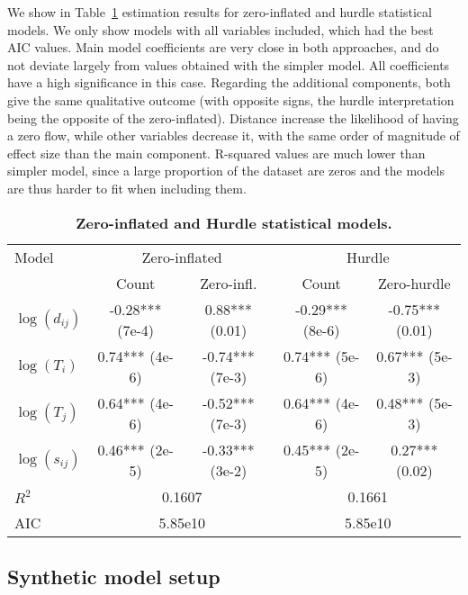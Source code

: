 We show in Table~\ref{tab:zeroinfl} estimation results for zero-inflated and hurdle statistical models. We only show models with all variables included, which had the best AIC values. Main model coefficients are very close in both approaches, and do not deviate largely from values obtained with the simpler model. All coefficients have a high significance in this case. Regarding the additional components, both give the same qualitative outcome (with opposite signs, the hurdle interpretation being the opposite of the zero-inflated). Distance increase the likelihood of having a zero flow, while other variables decrease it, with the same order of magnitude of effect size than the main component. R-squared values are much lower than simpler model, since a large proportion of the dataset are zeros and the models are thus harder to fit when including them.


\begin{table}[!ht]
\begin{adjustwidth}{-1in}{0in}
\caption{{\bf Zero-inflated and Hurdle statistical models.}\label{tab:zeroinfl}}
\medskip
\begin{tabular}{|l|c|c|c|c|}
\hline
Model  & \multicolumn{2}{|c|}{Zero-inflated} & \multicolumn{2}{|c|}{Hurdle} \\ 
 & Count & Zero-infl. & Count & Zero-hurdle \\
\hline
$\log(d_{ij})$ &    -0.28*** (7e-4) &   0.88*** (0.01)      &   -0.29*** (8e-6)   &  -0.75*** (0.01)    \\
$\log(T_i)$ & 0.74*** (4e-6)  & -0.74*** (7e-3)       &   0.74***  (5e-6)     &  0.67*** (5e-3)   \\
$\log(T_j)$ & 0.64*** (4e-6)  & -0.52*** (7e-3)      &    0.64***  (4e-6)     &  0.48*** (5e-3)    \\
$\log(s_{ij})$ & 0.46*** (2e-5)   &  -0.33*** (3e-2)  &  0.45*** (2e-5)       &  0.27*** (0.02)    \\
\hline
$R^2$ &   \multicolumn{2}{|c|}{0.1607}     &  \multicolumn{2}{|c|}{0.1661}  \\
AIC &     \multicolumn{2}{|c|}{5.85e10}    &   \multicolumn{2}{|c|}{5.85e10}  \\
\hline
\end{tabular}
\end{adjustwidth}
\end{table}



\subsection*{Synthetic model setup}

